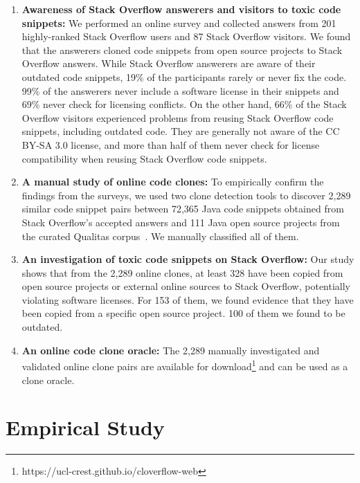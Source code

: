 \documentclass[10pt,journal,compsoc]{IEEEtran}
\begin{document}
\begin{enumerate} 
	
	\item \textbf{Awareness of Stack Overflow answerers and visitors to toxic code
	snippets:} We performed an online survey and collected answers from 201
highly-ranked Stack Overflow users and 87 Stack Overflow visitors. 
We found that the answerers cloned code snippets
from open source projects to Stack Overflow answers. While Stack Overflow
answerers are aware of their outdated code snippets, 19\% of the participants
rarely or never fix the code. 99\% of the answerers never include a software
license in their snippets and 69\% never check for licensing conflicts.
On the other hand, 66\% of the
Stack Overflow visitors experienced problems from reusing Stack Overflow code snippets, including outdated code. 
They are generally not aware of the CC BY-SA 3.0 license, and more than
half of them never check for license compatibility when reusing Stack Overflow
code snippets.
	
	\item \textbf{A manual study of online code clones:} 
	To empirically confirm the findings from the surveys, we used
	two clone detection tools to discover 2,289 similar code snippet pairs between
	72,365 Java code snippets obtained from Stack Overflow's accepted answers and
	111 Java open source projects from the curated Qualitas
	corpus~\cite{QualitasCorpus}. We manually
	classified all of them.
	
	\item \textbf{An investigation of toxic code snippets on Stack Overflow:} Our study shows that from
	the 2,289 online clones, at least 328 have been copied from open source
	projects or external online sources to Stack Overflow, potentially violating
	software licenses. For 153 of them, we found evidence that they have been copied
	from a specific open source project. 100 of them we found to be outdated. %
	
	\item \textbf{An online code
		clone oracle:} The 2,289 manually investigated and validated online clone pairs
	are available for download\footnote{https://ucl-crest.github.io/cloverflow-web} and
	can be used as a clone oracle. \end{enumerate}

\section{Empirical Study}
\end{document}
